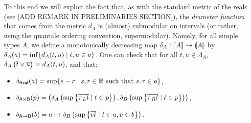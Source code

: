To this end we will exploit the fact that, as with the standard metric of the reals (see [ADD REMARK IN PRELIMINARIES SECTION]), the \emph{diameter function} that comes from the metric $d_{A}$ is (almost) submodular on intervals (or rather, using the quantale ordering convention, supermodular). Namely, for all simple types $A$, we define a monotonically decreasing map $\delta_A : \llbracket A \rrbracket \to \llparenthesis A \rrparenthesis$ by $\delta_A(a) = \inf \{ d_A(t,u) \mid t,u \in a \}$. One can check that for all $t,u \in \Lambda_A$, $\delta_A\left(\overline{t} \vee \overline{u}\right) = d_A(t,u)$, and that:
\begin{itemize}
\item $\delta_\mathsf{Real}(a) = \sup\{s-r \mid s,r \in \mathbb{R} \text{ such that } s,r \in a\}$,
\item $\delta_\mathsf{A \times B}(p) = \left(\delta_A\left(\sup\left\{\overline{\pi_L t} \mid t \in p\right\}\right), \delta_B\left(\sup\left\{\overline{\pi_R t} \mid t \in p\right\}\right)\right)$,
\item $\delta_\mathsf{A \to B}(b) = a \mapsto \delta_B\left(\sup\left\{\overline{vt} \mid t\in a, v \in b\right\}\right).$
\end{itemize}


